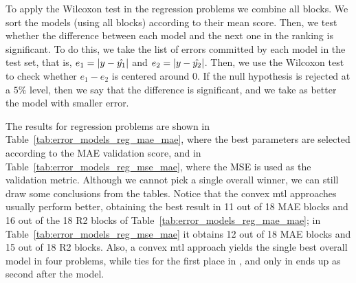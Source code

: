 %
To apply the Wilcoxon test in the regression problems we combine all blocks. We sort the models (using all blocks) according to their mean score. Then, we test whether the difference between each model and the next one in the ranking is significant. To do this, we take the list of errors committed by each model in the test set, that is, $e_1 = \left|y - \hat{y_1}\right|$ and $e_2 = \left|y - \hat{y_2}\right|$. Then, we use the Wilcoxon test to check whether $e_1 - e_2$ is centered around 0.
If the null hypothesis is rejected at a $5\%$ level, then we say that the difference is significant, and we take as better the model with smaller error.
%
%

The results for regression problems are shown in Table~\ref{tab:error_models_reg_mae_mae}, where the best parameters are selected according to the MAE validation score, and in Table~\ref{tab:error_models_reg_mse_mae}, where the MSE is used as the validation metric.
%
Although we cannot pick a single overall winner, we can still draw some conclusions from the tables. Notice that the convex \acrshort{mtl} approaches usually perform better, obtaining the best result in 11 out of 18 MAE blocks and 16 out of the 18 R2 blocks of Table~\ref{tab:error_models_reg_mae_mae}; in Table~\ref{tab:error_models_reg_mse_mae} it obtains 12 out of 18 MAE blocks and 15 out of 18 R2 blocks.
Also, a convex \acrshort{mtl} approach yields the single best overall model in four problems, while ties for the first place in , and only in  ends up as second after the  model.


